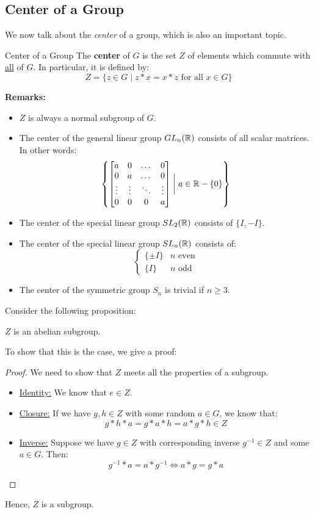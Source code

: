 \documentclass[letterpaper]{article}
\begin{document}
\subsection{Center of a Group}
We now talk about the \emph{center} of a group, which is also an important topic. 

\begin{definition}{Center of a Group}{}
    The \textbf{center} of $G$ is the set $Z$ of elements which commute with \underline{all} of $G$. In particular, it is defined by: 
    \[Z = \{z \in G \mid z * x = x * z \text{ for all } x \in G\}\]
\end{definition}
\textbf{Remarks:}
\begin{itemize}
    \item $Z$ is always a normal subgroup of $G$. 
    \item The center of the general linear group $GL_{n}(\mathbb{R})$ consists of all scalar matrices. In other words:
    \[\left\{\begin{bmatrix}
        a & 0 & \dots & 0 \\ 
        0 & a & \dots & 0 \\ 
        \vdots & \vdots & \ddots & \vdots \\ 
        0 & 0 & 0 & a 
    \end{bmatrix} \mathrel{\bigg|} a \in \mathbb{R} - \{0\}\right\}\]
    \item The center of the special linear group $SL_{2}(\mathbb{R})$ consists of $\{I, -I\}$. 
    \item The center of the special linear group $SL_{n}(\mathbb{R})$ consists of: 
    \[
        \begin{cases}
            \{\pm I\} & n \text{ even} \\ 
            \{I\} & n \text{ odd}
        \end{cases}    
    \]
    \item The center of the symmetric group $S_n$ is trivial if $n \geq 3$.
\end{itemize}

Consider the following proposition: 
\begin{proposition}
    $Z$ is an abelian subgroup. 
\end{proposition}
To show that this is the case, we give a proof: 
\begin{mdframed}
    \begin{proof}
        We need to show that $Z$ meets all the properties of a subgroup. 
        \begin{itemize}
            \item \underline{Identity:} We know that $e \in Z$. 
            \item \underline{Closure:} If we have $g, h \in Z$ with some random $a \in G$, we know that: 
            \[g * h * a = g * a * h = a * g * h \in Z\]
            \item \underline{Inverse:} Suppose we have $g \in Z$ with corresponding inverse $g^{-1} \in Z$ and some $a \in G$. Then: 
            \[g^{-1} * a = a * g^{-1} \iff a * g = g * a\]
        \end{itemize}
    \end{proof}
    Hence, $Z$ is a subgroup. 
\end{mdframed}
\end{document}
